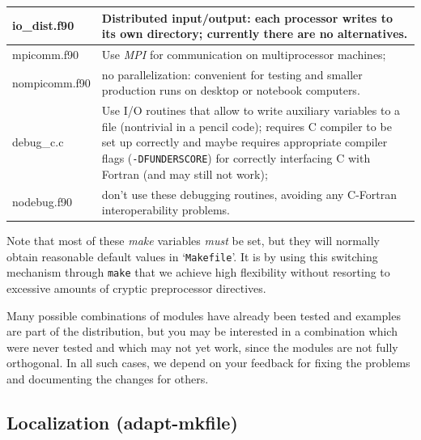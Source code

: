 \documentclass[12pt,twoside,notitlepage,a4paper]{article}
\newcommand{\code}[1]{\texttt{#1}}
\newcommand{\file}[1]{`\texttt{#1}'}
\newcommand{\command}[1]{\code{#1}\index{#1}}
\newcommand{\cmd}[1]{\command{#1}}
\newcommand{\name}[1]{\textsl{#1}\index{#1}\/}
\begin{document}
\begin{table}
\begin{tabular}{lp{}}
    \midrule
    io_dist.f90    & Distributed input/output: each processor writes to
                     its own directory; currently there are no
                     alternatives. \\
    \midrule
    mpicomm.f90    & Use \name{MPI} for communication on multiprocessor
                     machines; \\
    nompicomm.f90  & no parallelization: convenient for testing and
                     smaller production runs on desktop or notebook
                     computers. \\
    \midrule
    debug_c.c      & Use I/O routines that allow to write auxiliary
                     variables to a file (nontrivial in a pencil code);
                     requires C compiler to be set up correctly and maybe
                     requires appropriate compiler flags
                     (\code{-DFUNDERSCORE}) for correctly interfacing C
                     with Fortran (and may still not work); \\
    nodebug.f90    & don't use these debugging routines, avoiding any
                     C-Fortran interoperability problems. \\
    \bottomrule
  \end{tabular}
\end{table}


Note that most of these \name{make} variables \emph{must} be set, but they
will normally obtain reasonable default values in \file{Makefile}.
It is by using this switching mechanism through \cmd{make} that we achieve
high flexibility without resorting to excessive amounts of cryptic
preprocessor directives.
 
Many possible combinations of modules have already been tested
and examples are part of the distribution, but you may be interested in a
combination which were never tested and which may not yet work, since the
modules are not fully orthogonal.
In all such cases, we depend on your feedback for fixing the problems
and documenting the changes for others.



\subsection{Localization (adapt-mkfile)}


\end{document}
